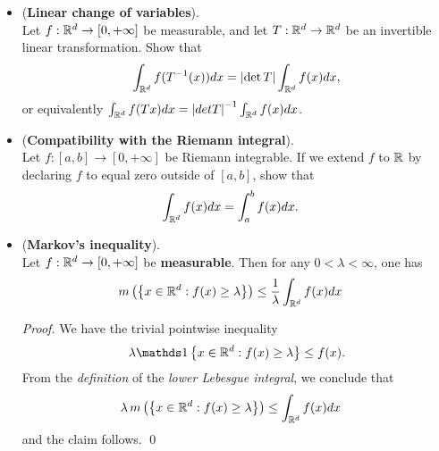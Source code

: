 \documentclass[11pt]{article}
\begin{document}
\begin{itemize}
\item \begin{exercise}  (\textbf{Linear change of variables}).\\
Let $f : {\mathbb R}^d \rightarrow [0,+\infty]$  be measurable, and let $T : {\mathbb R}^d \rightarrow {\mathbb R}^d$ be an invertible linear transformation. Show that 
\begin{align*}
\int_{{\mathbb R}^d} f(T^{-1}(x)) dx = \left\lvert \det{T} \right\rvert \int_{{\mathbb R}^d} f(x) dx,
\end{align*}
or equivalently $\int_{{\mathbb R}^d} f(Tx) dx = \left\lvert det{T} \right\rvert^{-1} \int_{{\mathbb R}^d} f(x) dx$.
\end{exercise}

\item \begin{exercise} (\textbf{Compatibility with the Riemann integral}).\\
Let $f : [a, b] \rightarrow [0,+\infty]$ be Riemann integrable. If we extend $f$ to ${\mathbb R}$ by declaring $f$ to equal zero outside of $[a, b]$, show that
\begin{align*}
\int_{{\mathbb R}^{d}}f(x)dx &= \int_{a}^{b}f(x)dx.
\end{align*}
\end{exercise}

\item \begin{lemma}(\textbf{Markov's inequality}).\\
 Let $f : {\mathbb R}^d \rightarrow [0,+\infty]$ be \textbf{measurable}. Then for any $0 < \lambda < \infty$, one has
\begin{align*}
m\left(\left\{x\in {\mathbb R}^{d}: f(x)\ge \lambda\right\}\right) &\le \frac{1}{\lambda}\int_{{\mathbb R}^{d}}f(x)dx
\end{align*}
\end{lemma}
\begin{proof}
We have the trivial pointwise inequality
\begin{align*}
\lambda \ind{x\in \bR^d: f(x) \ge \lambda} \le f(x).
\end{align*}
From the \emph{definition} of the \emph{lower Lebesgue integral}, we conclude that
\begin{align*}
\lambda \,m\left(\left\{x\in {\mathbb R}^d: f(x) \ge \lambda\right\}\right) &\le \int_{{\mathbb R}^{d}}f(x)dx
\end{align*} and the claim follows. \qed
\end{proof}


\end{itemize}
\end{document}
